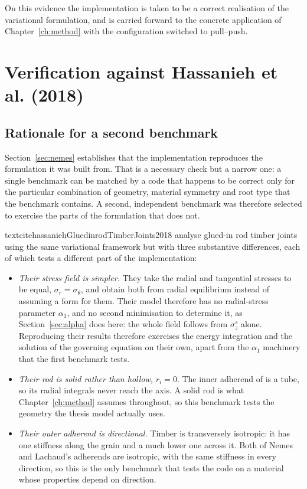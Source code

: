 On this evidence the implementation is taken to be a correct realisation of
the variational formulation, and is carried forward to the concrete
application of Chapter~\ref{ch:method} with the configuration switched to
pull--push.
 
\section{Verification against Hassanieh et al. (2018)}
\label{sec:hassanieh}
 
\subsection{Rationale for a second benchmark}
\label{sec:whysecond}
 
Section~\ref{sec:nemes} establishes that the implementation reproduces the
formulation it was built from. That is a necessary check but a narrow one: a
single benchmark can be matched by a code that happens to be correct only for
the particular combination of geometry, material symmetry and root type that
the benchmark contains. A second, independent benchmark was therefore
selected to exercise the parts of the formulation that
\textcite{nemesModelingCylindricalAdhesively2009} does not.
 
textcite{hassaniehGluedinrodTimberJoints2018} analyse glued-in rod timber joints
using the same variational framework but with three substantive differences,
each of which tests a different part of the implementation:
 
\begin{itemize}
\item \emph{Their stress field is simpler.} They take the radial and
      tangential stresses to be equal, $\sigma_r = \sigma_\theta$, and obtain
      both from radial equilibrium instead of assuming a form for them. Their
      model therefore has no radial-stress parameter $\alpha_1$, and no second
      minimisation to determine it, as Section~\ref{sec:alpha} does here: the
      whole field follows from $\sigma_z^{s}$ alone. Reproducing their results
      therefore exercises the energy integration and the solution of the
      governing equation on their own, apart from the $\alpha_1$ machinery
      that the first benchmark tests.
\item \emph{Their rod is solid rather than hollow,} $r_i = 0$. The inner
      adherend of \textcite{nemesModelingCylindricalAdhesively2009} is a tube,
      so its radial integrals never reach the axis. A solid rod is what
      Chapter~\ref{ch:method} assumes throughout, so this benchmark tests the
      geometry the thesis model actually uses.
\item \emph{Their outer adherend is directional.} Timber is transversely
      isotropic: it has one stiffness along the grain and a much lower one
      across it. Both of Nemes and Lachaud's adherends are isotropic, with the
      same stiffness in every direction, so this is the only benchmark that
      tests the code on a material whose properties depend on direction.
\end{itemize}
 
